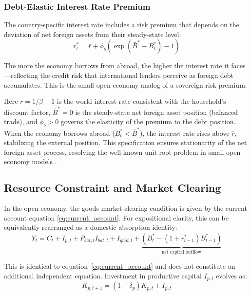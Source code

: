 \documentclass[12pt, a4paper]{article}
\begin{document}
\subsubsection{Debt-Elastic Interest Rate Premium}

The country-specific interest rate includes a risk premium that depends on the deviation of net foreign assets from their steady-state level:
\begin{equation}
r^*_t = \bar{r} + \phi_b \left( \exp(\bar{B}^* - B^*_t) - 1 \right)
\label{eq:interest_premium}
\end{equation}

The more the economy borrows from abroad, the higher the interest rate it faces---reflecting the credit risk that international lenders perceive as foreign debt accumulates. This is the small open economy analog of a sovereign risk premium.

Here $\bar{r} = 1/\beta - 1$ is the world interest rate consistent with the household's discount factor, $\bar{B}^* = 0$ is the steady-state net foreign asset position (balanced trade), and $\phi_b > 0$ governs the elasticity of the premium to the debt position. When the economy borrows abroad ($B^*_t < \bar{B}^*$), the interest rate rises above $\bar{r}$, stabilizing the external position. This specification ensures stationarity of the net foreign asset process, resolving the well-known unit root problem in small open economy models \citep{schmittgrohe2003}.

\subsection{Resource Constraint and Market Clearing}

In the open economy, the goods market clearing condition is given by the current account equation \eqref{eq:current_account}. For expositional clarity, this can be equivalently rearranged as a domestic absorption identity:
\begin{equation}
Y_t = C_t + I_{p,t} + P_{bat,t} I_{bat,t} + I_{grid,t} + \underbrace{(B^*_t - (1+r^*_{t-1})B^*_{t-1})}_{\text{net capital outflow}}
\label{eq:goods_market_clearing}
\end{equation}

\noindent This is identical to equation~\eqref{eq:current_account} and does not constitute an additional independent equation. Investment in productive capital $I_{p,t}$ evolves as:
\begin{equation}
K_{p,t+1} = (1-\delta_p) K_{p,t} + I_{p,t}
\label{eq:productive_capital}
\end{equation}
\end{document}
